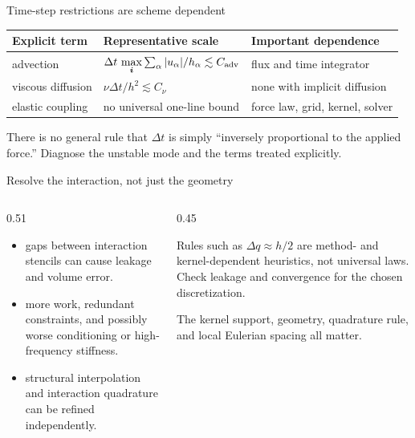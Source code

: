 \documentclass[aspectratio=169,11pt]{beamer}
\begin{document}
\begin{frame}{Time-step restrictions are scheme dependent}
\small
\renewcommand{\arraystretch}{1.22}
\begin{tabular}{@{}p{}p{}p{}@{}}
\toprule
Explicit term & Representative scale & Important dependence \\
\midrule
advection & $\Delta t\,\max\limits_{\bm{i}}\sum_\alpha |u_\alpha|/h_\alpha\lesssim C_{\rm adv}$ & flux and time integrator \\
viscous diffusion & $\nu\Delta t/h^2\lesssim C_\nu$ & none with implicit diffusion \\
elastic coupling & no universal one-line bound & force law, grid, kernel, solver \\
\bottomrule
\end{tabular}
\medskip
\begin{punchbox}
There is no general rule that $\Delta t$ is simply ``inversely proportional to the applied force.'' Diagnose the unstable mode and the terms treated explicitly.
\end{punchbox}
\end{frame}

\begin{frame}{Resolve the interaction, not just the geometry}
\begin{columns}[T,onlytextwidth]
\begin{column}{0.51\textwidth}
\begin{itemize}\itemsep5pt
  \item {} gaps between interaction stencils can cause leakage and volume error.
  \item {} more work, redundant constraints, and possibly worse conditioning or high-frequency stiffness.
  \item {} structural interpolation and interaction quadrature can be refined independently.
\end{itemize}
\end{column}
\begin{column}{0.45\textwidth}
\begin{punchbox}
Rules such as $\Delta q\approx h/2$ are method- and kernel-dependent heuristics, not universal laws. Check leakage and convergence for the chosen discretization.
\end{punchbox}
\medskip
The kernel support, geometry, quadrature rule, and local Eulerian spacing all matter.
\end{column}
\end{columns}
\end{frame}
\end{document}
